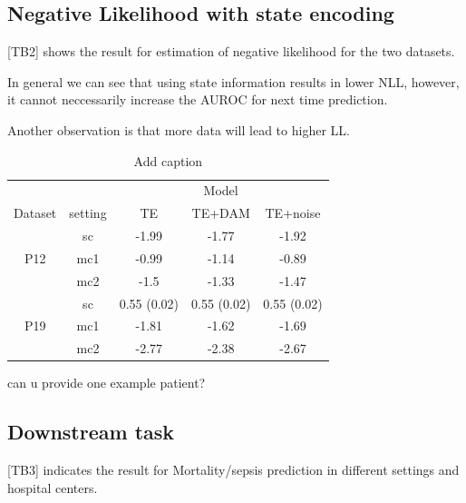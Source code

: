 \documentclass[journal,twoside,web]{ieeecolor}
\begin{document}
  
  
  





\subsection{Negative Likelihood with state encoding}

[TB2] shows the result for estimation of negative likelihood for the two datasets. 

In general we can see that using state information results in lower NLL, however, it cannot neccessarily increase the AUROC for next time prediction.

Another observation is that more data will lead to higher LL.




\begin{table}[htbp]
    \centering
    \caption{Add caption}
      \begin{tabular}{ccccc}
      \toprule
            &       & \multicolumn{3}{c}{Model} \\
  \cmidrule{3-5}    Dataset & setting & TE    & TE+DAM & TE+noise \\
      \midrule
      \multirow{3}[2]{*}{P12} & sc    & -1.99 & -1.77 & -1.92 \\
            & mc1   & -0.99 & -1.14 & -0.89 \\
            & mc2   & -1.5  & -1.33 & -1.47 \\
      \midrule
      \multirow{3}[2]{*}{P19} & sc    & 0.55 (0.02) & 0.55 (0.02) & 0.55 (0.02) \\
            & mc1   & -1.81 & -1.62 & -1.69 \\
            & mc2   & -2.77 & -2.38 & -2.67 \\
      \bottomrule
      \end{tabular}%
    \label{tab:addlabel}%
  \end{table}%
  




can u provide one example patient?

\subsection{Downstream task}

[TB3] indicates the result for Mortality/sepsis prediction in different settings and hospital centers.
\end{document}
